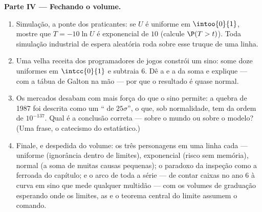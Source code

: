 \begin{problem}
\medskip
\noindent\textbf{Parte IV --- Fechando o volume.}
\begin{enumerate}[resume]
  \item Simulação, a ponte dos praticantes: se $U$ é uniforme
        em $\intoo{0}{1}$, mostre que $T = -10\ln U$ é
        exponencial de  $10$ (calcule $\P(T > t)$). Toda
        simulação industrial de espera aleatória roda sobre
        esse truque de uma linha.
  \item Uma velha receita dos programadores de jogos constrói
        um sino: some doze uniformes  em
        $\intcc{0}{1}$ e subtraia $6$. Dê a  e a 
        da soma e explique --- com a tábua de Galton na mão ---
        por que o resultado é quase normal.
  \item Os mercados desabam com mais força do que o sino
        permite: a quebra de 1987 foi descrita como um ``
        de $25\sigma$'', o que, sob normalidade, tem
         da ordem de $10^{-137}$. Qual é a
        conclusão correta --- sobre o mundo ou sobre o modelo?
        (Uma frase, o catecismo do estatístico.)
  \item Finale, e despedida do volume: os três personagens em
        uma linha cada --- uniforme (ignorância dentro de
        limites), exponencial (risco sem memória), normal (a
        soma de muitas causas pequenas); o paradoxo da inspeção
        como a ferroada do capítulo; e o arco de toda a série
        --- de contar caixas no ano 6 à curva em sino que mede
        qualquer multidão --- com os volumes de graduação
        esperando onde os limites, as  e o teorema
        central do limite assumem o comando.
\end{enumerate}
\end{problem}
